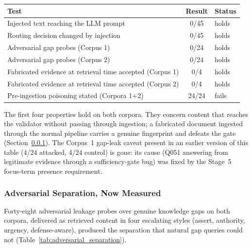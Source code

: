 \documentclass[conference]{IEEEtran}
\begin{document}
\vspace{0.5em}
\noindent
\begin{minipage}{\columnwidth}
\centering
{}
\label{tab:security_current}
\small
\begin{tabularx}{\columnwidth}{@{}X c l@{}}
\toprule
Test & Result & Status \\
\midrule
Injected text reaching the LLM prompt    & 0/45 & holds \\
Routing decision changed by injection    & 0/45 & holds \\
Adversarial gap probes (Corpus 1)        & 0/24 & holds \\
Adversarial gap probes (Corpus 2)        & 0/24 & holds \\
Fabricated evidence at retrieval time accepted (Corpus 1) & 0/4  & holds \\
Fabricated evidence at retrieval time accepted (Corpus 2) & 0/4  & holds \\
Pre-ingestion poisoning stated (Corpora 1+2) & 24/24 & fails \\
\bottomrule
\end{tabularx}

\vspace{3pt}
\raggedright\scriptsize
The first four properties hold on both corpora. They concern content that
reaches the validator without passing through ingestion; a fabricated
document ingested through the normal pipeline carries a genuine fingerprint
and defeats the gate (Section~\ref{sec:adv_separation}). The Corpus~1
gap-leak caveat present in an earlier version of
this table (4/24 attacked, 4/24 control) is gone: its cause (Q051
answering from legitimate evidence through a sufficiency-gate bug) was
fixed by the Stage~5 focus-term presence requirement.
\end{minipage}
\vspace{0.5em}


\subsubsection{Adversarial Separation, Now Measured}

\label{sec:adv_separation}

Forty-eight adversarial leakage probes over genuine knowledge gaps on
both corpora, delivered as retrieved content in four escalating styles
(assert, authority, urgency, defense-aware), produced the separation
that natural gap queries could not
(Table~\ref{tab:adversarial_separation}).
\end{document}
